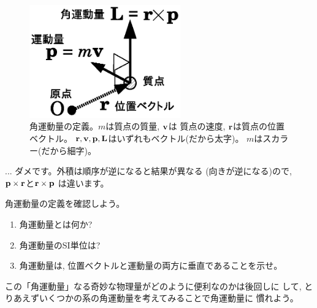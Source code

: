\begin{figure}[h]
    \centering
    \includegraphics[width=6.5cm]{angular_mom.eps}
    \caption{角運動量の定義。$m$は質点の質量, ${\bf v}$は
質点の速度, ${\bf r}$は質点の位置ベクトル。
${\bf r}, {\bf v}, {\bf p}, {\bf L}$はいずれもベクトル(だから太字)。
$m$はスカラー(だから細字)。}\label{fig:angular_mom}
\end{figure}

\begin{freqmiss}{\small{} ... ダメです。外積は順序が逆になると結果が異なる
(向きが逆になる)ので, ${\bf p}\times{\bf r}$と${\bf r}\times{\bf p}$
は違います。}\end{freqmiss}

%
\begin{q}\label{q:angular_momentum} 角運動量の定義を確認しよう。
\begin{enumerate} 
\item 角運動量とは何か?
\item 角運動量のSI単位は?
\item 角運動量は, 位置ベクトルと運動量の両方に垂直であることを示せ。
\end{enumerate}
\end{q}
\mv

この「角運動量」なる奇妙な物理量がどのように便利なのかは後回しに
して, とりあえずいくつかの系の角運動量を考えてみることで角運動量に
慣れよう。\mv


